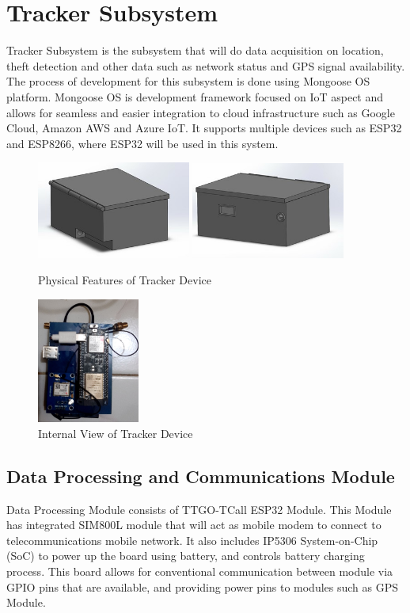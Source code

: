 \documentclass[conference]{IEEEtran}
\begin{document}
\section{Tracker Subsystem}
Tracker Subsystem is the subsystem that will do data acquisition on location, theft detection and other data such as network status and GPS signal availability. 
The process of development for this subsystem is done using Mongoose OS platform. Mongoose OS is development framework focused on IoT aspect and allows for seamless and easier 
integration to cloud infrastructure such as Google Cloud, Amazon AWS and Azure IoT. It supports multiple devices such as ESP32 and ESP8266, where ESP32 will be used in this system.
\begin{figure}[htbp]
    \centering
    \includegraphics[width=0.45\textwidth]{casing1}
    \includegraphics[width=0.45\textwidth]{casing2}
    \caption{Physical Features of Tracker Device}
    \label{fig1}
\end{figure}
\begin{figure}[htbp]
    \centering
    \includegraphics[width=0.3\textwidth]{fotoalat}
    \caption{Internal View of Tracker Device}
    \label{fig1}
\end{figure}
\subsection{Data Processing and Communications Module}
Data Processing Module consists of TTGO-TCall ESP32 Module. This Module has integrated SIM800L module that will act as mobile modem to connect to telecommunications 
mobile network. It also includes IP5306 System-on-Chip (SoC) to power up the board using battery, and controls battery charging process. This board allows for 
conventional communication between module via GPIO pins that are available, and providing power pins to modules such as GPS Module.
\end{document}
